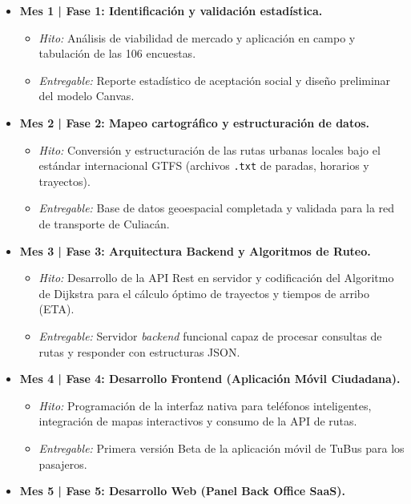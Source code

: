 \documentclass[12pt,letterpaper]{article}
\begin{document}
\begin{itemize}[leftmargin=*]
  \item \textbf{Mes 1 | Fase 1: Identificación y validación estadística.}
    \begin{itemize}
      \item \textit{Hito:} Análisis de viabilidad de mercado y aplicación en
        campo y tabulación de las 106 encuestas.
      \item \textit{Entregable:} Reporte estadístico de aceptación social y
        diseño preliminar del modelo Canvas.
    \end{itemize}
  \item \textbf{Mes 2 | Fase 2: Mapeo cartográfico y estructuración de datos.}
    \begin{itemize}
      \item \textit{Hito:} Conversión y estructuración de las rutas urbanas
        locales bajo el estándar internacional GTFS (archivos \texttt{.txt} de
        paradas, horarios y trayectos).
      \item \textit{Entregable:} Base de datos geoespacial completada y validada
        para la red de transporte de Culiacán.
    \end{itemize}
  \item \textbf{Mes 3 | Fase 3: Arquitectura Backend y Algoritmos de Ruteo.}
    \begin{itemize}
      \item \textit{Hito:} Desarrollo de la API Rest en servidor y codificación
        del Algoritmo de Dijkstra para el cálculo óptimo de trayectos y tiempos
        de arribo (ETA).
      \item \textit{Entregable:} Servidor \textit{backend} funcional capaz de
        procesar consultas de rutas y responder con estructuras JSON.
    \end{itemize}
  \item \textbf{Mes 4 | Fase 4: Desarrollo Frontend (Aplicación Móvil Ciudadana).}
    \begin{itemize}
      \item \textit{Hito:} Programación de la interfaz nativa para teléfonos
        inteligentes, integración de mapas interactivos y consumo de la API de
        rutas.
      \item \textit{Entregable:} Primera versión Beta de la aplicación móvil de
        TuBus para los pasajeros.
    \end{itemize}
  \item \textbf{Mes 5 | Fase 5: Desarrollo Web (Panel Back Office SaaS).}

\end{itemize}
\end{document}

